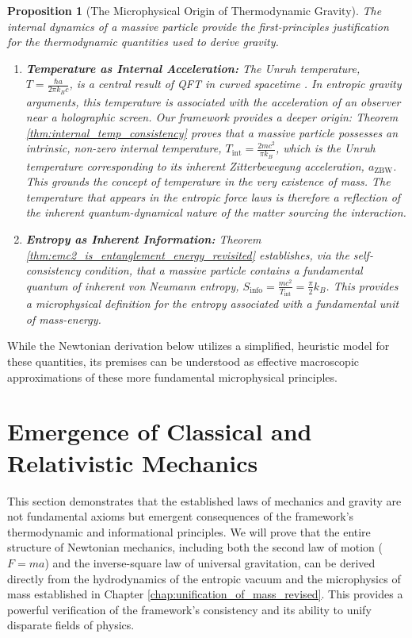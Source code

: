 \documentclass[11pt, letterpaper]{report}
\theoremstyle{plain} %
\newtheorem{proposition}[theorem]{Proposition}
\theoremstyle{definition} %
\theoremstyle{remark} %
\begin{document}
\begin{proposition}[The Microphysical Origin of Thermodynamic Gravity]
\label{prop:microphysical_origin_gravity}
The internal dynamics of a massive particle provide the first-principles justification for the thermodynamic quantities used to derive gravity.
\begin{enumerate}
    \item \textbf{Temperature as Internal Acceleration:} The Unruh temperature, $T = \frac{\hbar a}{2\pi k_B c}$, is a central result of QFT in curved spacetime \cite{Unruh1976}. In entropic gravity arguments, this temperature is associated with the acceleration of an observer near a holographic screen. Our framework provides a deeper origin: Theorem \ref{thm:internal_temp_consistency} proves that a massive particle possesses an intrinsic, non-zero internal temperature, $T_{\text{int}} = \frac{2mc^2}{\pi k_B}$, which is the Unruh temperature corresponding to its inherent Zitterbewegung acceleration, $a_{\text{ZBW}}$. This grounds the concept of temperature in the very existence of mass. The temperature that appears in the entropic force laws is therefore a reflection of the inherent quantum-dynamical nature of the matter sourcing the interaction.

    \item \textbf{Entropy as Inherent Information:} Theorem \ref{thm:emc2_is_entanglement_energy_revisited} establishes, via the self-consistency condition, that a massive particle contains a fundamental quantum of inherent von Neumann entropy, $S_{\text{info}} = \frac{mc^2}{T_{\text{int}}} = \frac{\pi}{2} k_B$. This provides a microphysical definition for the entropy associated with a fundamental unit of mass-energy.
\end{enumerate}
\end{proposition}
While the Newtonian derivation below utilizes a simplified, heuristic model for these quantities, its premises can be understood as effective macroscopic approximations of these more fundamental microphysical principles.

\section{Emergence of Classical and Relativistic Mechanics}
\label{sec:verify_mechanics}

This section demonstrates that the established laws of mechanics and gravity are not fundamental axioms but emergent consequences of the framework’s thermodynamic and informational principles. We will prove that the entire structure of Newtonian mechanics, including both the second law of motion ($F=ma$) and the inverse-square law of universal gravitation, can be derived directly from the hydrodynamics of the entropic vacuum and the microphysics of mass established in Chapter \ref{chap:unification_of_mass_revised}. This provides a powerful verification of the framework's consistency and its ability to unify disparate fields of physics.
\end{document}
